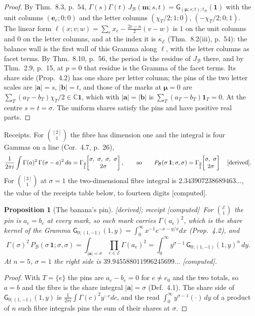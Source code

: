 \documentclass[11pt]{article}
\newcommand{\cE}{\mathcal E}
\newcommand{\cB}{\mathcal B}
\newcommand{\one}{\mathbf 1}
\newcommand{\mvec}{\mathbf m}
\newcommand{\bmu}{\boldsymbol\mu}
\newcommand{\sG}{\mathsf G}
\newcommand{\Gst}[4]{\Gamma_{\substack{#1\\#2}}\!\begin{bmatrix}#3\\#4\end{bmatrix}}
\newcommand{\Pc}[1]{P_{\cB}(#1\,\one;#1,#1)}
\theoremstyle{plain}
\newtheorem{proposition}{Proposition}[section]
\theoremstyle{definition}
\theoremstyle{remark}
\newcommand{\derived}{\textup{[derived]}}
\newcommand{\computed}{\textup{[computed]}}
\begin{document}
\begin{proof}
By Thm.~8.3, p.~54, $\Gamma(s)\Gamma(t)\,J_{\cB}(\mvec;s,t)=\sG_{(\bmu;s;t);t_{\cB}}(\one)$ with the unit columns $(\mathbf e_e;0;0)$ and the letter columns $(\chi_T/2;1;0)$, $(-\chi_T/2;0;1)$. The linear form $\ell(x;v;w)=\sum_ex_e-\frac{2r-n}2(v-w)$ is $1$ on the unit columns and $0$ on the letter columns, and at the index it is $\kappa_{\cE}$ (Thm.~8.2(iii), p.~54): the balance wall is the first wall of this Gramma along $\ell$, with the letter columns as facet terms. By Thm.~8.10, p.~56, the period is the residue of $J_{\cB}$ there, and by Thm.~2.9, p.~15, at $p=0$ that residue is the Gramma of the facet terms. Its share side (Prop.~4.2) has one share per letter column; the pins of the two letter scales are $|\mathbf a|=s$, $|\mathbf b|=t$, and those of the marks at $\bmu=0$ are $\sum_T(a_T-b_T)\chi_T/2\in\mathbb C\one$, which with $|\mathbf a|=|\mathbf b|$ is $\sum_T(a_T-b_T)\one_T=0$. At the centre $s=t=\sigma$. The uniform shares satisfy the pins and have positive real parts.
\end{proof}

\noindent Receipts. For $\binom{[2]}1$ the fibre has dimension one and the integral is four Gammas on a line (Cor.~4.7, p.~26),
\[
\frac1{2\pi i}\int\Gamma(a)^2\,\Gamma(\sigma-a)^2\,da=\Gst41{\sigma,\ \sigma,\ \sigma,\ \sigma}{2\sigma},\qquad\text{so}\qquad \Pc\sigma=\Gst21{\sigma,\ \sigma}{2\sigma}\quad\derived.
\] For $\binom{[3]}1$ at $\sigma=1$ the two-dimensional fibre integral is $2.343907238689463\ldots$, the value of the receipts table below, to fourteen digits \computed.

\begin{proposition}[The banana's pin]\label{p:bananapin}\derived; receipt \computed\
For $\binom{\cE}1$ the pin is $a_e=b_e$ at every mark, so each mark carries $\Gamma(a_e)^2$, which is the share kernel of the Gramma $\sG_{0;(1,-1)}(1,y)=\int_0^\infty x^{-1}e^{-x-y/x}dx$ (Prop.~4.2), and
\[
\Gamma(\sigma)^2\,\Pc\sigma=\int_{|\mathbf a|=\sigma}\prod_{e\in\cE}\Gamma(a_e)^2=\int_0^\infty y^{\sigma-1}\,\sG_{0;(1,-1)}(1,y)^n\,dy .
\]
At $n=5$, $\sigma=1$ the right side is $39.945588011996245699\ldots$ \computed.
\end{proposition}

\begin{proof}
With $T=\{e\}$ the pins are $a_e-b_e=0$ for $e\neq e_0$ and the two totals, so $a=b$ and the fibre is the share integral $|\mathbf a|=\sigma$ (Def.~4.1). The share side of $\sG_{0;(1,-1)}(1,y)$ is $\frac1{2\pi i}\int\Gamma(c)^2y^{-c}dc$, and the read $\int_0^\infty y^{\sigma-1}(\cdot)\,dy$ of a product of $n$ such fibre integrals pins the sum of their shares at $\sigma$.
\end{proof}
\end{document}
